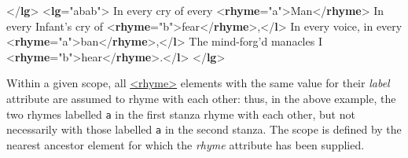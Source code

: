 \begin{shaded}
{</\textbf{lg}>}\mbox{}\newline 
{<\textbf{lg}\hspace*{1em}{rhyme}="{abab}">}\mbox{}\newline 
{}In every cry of every {<\textbf{rhyme}\hspace*{1em}{label}="{a}">}Man{</\textbf{rhyme}>}\mbox{}\newline 
{}\mbox{}\newline 
{}In every Infant's cry of {<\textbf{rhyme}\hspace*{1em}{label}="{b}">}fear{</\textbf{rhyme}>},{</\textbf{l}>}\mbox{}\newline 
{}In every voice, in every {<\textbf{rhyme}\hspace*{1em}{label}="{a}">}ban{</\textbf{rhyme}>},{</\textbf{l}>}\mbox{}\newline 
{}The mind-forg'd manacles I {<\textbf{rhyme}\hspace*{1em}{label}="{b}">}hear{</\textbf{rhyme}>}.{</\textbf{l}>}\mbox{}\newline 
{</\textbf{lg}>}\end{shaded}\egroup\par \par
Within a given scope, all \hyperref[TEI.rhyme]{<rhyme>} elements with the same value for their {\itshape label} attribute are assumed to rhyme with each other: thus, in the above example, the two rhymes labelled \texttt{a} in the first stanza rhyme with each other, but not necessarily with those labelled \texttt{a} in the second stanza. The scope is defined by the nearest ancestor element for which the {\itshape rhyme} attribute has been supplied.\par
